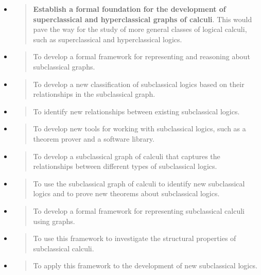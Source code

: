 \begin{itemize}
\item
  \begin{quote}
  \textbf{Establish a formal foundation for the development of
  superclassical and hyperclassical graphs of calculi}. This would pave
  the way for the study of more general classes of logical calculi, such
  as superclassical and hyperclassical logics.
  \end{quote}
\item
  \begin{quote}
  To develop a formal framework for representing and reasoning about
  subclassical graphs.
  \end{quote}
\item
  \begin{quote}
  To develop a new classification of subclassical logics based on their
  relationships in the subclassical graph.
  \end{quote}
\item
  \begin{quote}
  To identify new relationships between existing subclassical logics.
  \end{quote}
\item
  \begin{quote}
  To develop new tools for working with subclassical logics, such as a
  theorem prover and a software library.
  \end{quote}
\item
  \begin{quote}
  To develop a subclassical graph of calculi that captures the
  relationships between different types of subclassical logics.
  \end{quote}
\item
  \begin{quote}
  To use the subclassical graph of calculi to identify new subclassical
  logics and to prove new theorems about subclassical logics.
  \end{quote}
\item
  \begin{quote}
  To develop a formal framework for representing subclassical calculi
  using graphs.
  \end{quote}
\item
  \begin{quote}
  To use this framework to investigate the structural properties of
  subclassical calculi.
  \end{quote}
\item
  \begin{quote}
  To apply this framework to the development of new subclassical logics.

\end{quote}
\end{itemize}
